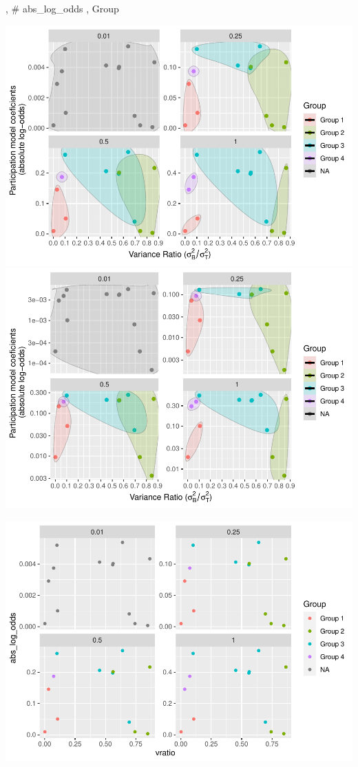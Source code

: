 \documentclass[
  man,floatsintext]{apa6}
\begin{document}
,
\# abs\_log\_odds , Group

\includegraphics{5---Analysis_files/figure-latex/unnamed-chunk-37-1.pdf}
\includegraphics{5---Analysis_files/figure-latex/unnamed-chunk-38-1.pdf}

\includegraphics{5---Analysis_files/figure-latex/unnamed-chunk-39-1.pdf}
\end{document}
